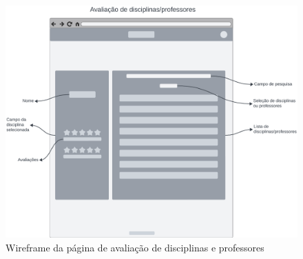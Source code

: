 \begin{figure}[ht]
    \begin{center}
    \includegraphics[width=390pt]{figuras/pagina-avaliacao.png}
    \caption{Wireframe da página de avaliação de disciplinas e professores}
    \label{fig:wireframe-pagina-avaliacao}
    \end{center}
\end{figure}